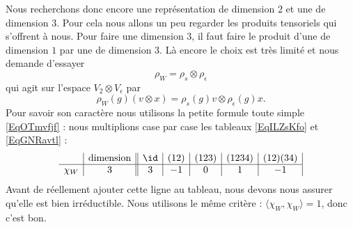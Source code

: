 Nous recherchons donc encore une représentation de dimension \( 2\) et une de dimension \( 3\). Pour cela nous allons un peu regarder les produits tensoriels qui s'offrent à nous. Pour faire une dimension \( 3\), il faut faire le produit d'une de dimension \( 1\) par une de dimension \( 3\). Là encore le choix est très limité et nous demande d'essayer
\begin{equation}
    \rho_W=\rho_s\otimes \rho_{\epsilon}
\end{equation}
qui agit sur l'espace \( V_2\otimes V_{\epsilon}\) par
\begin{equation}
    \rho_W(g)(v\otimes x)=\rho_s(g)v\otimes \rho_{\epsilon}(g)x.
\end{equation}
Pour savoir son caractère nous utilisons la petite formule toute simple \eqref{EqOTmvfjf} : nous multiplions case par case les tableaux \eqref{EqILZsKfo} et \eqref{EqGNRavtl} :
\begin{equation}
    \begin{array}[]{c|c||c|c|c|c|c|}
        &\text{dimension}&\id&(12)&(123)&(1234)&(12)(34)\\
          \hline
          \chi_{W}&3&3&-1&0&1&-1\\ 
    \end{array}
\end{equation}
Avant de réellement ajouter cette ligne au tableau, nous devons nous assurer qu'elle est bien irréductible. Nous utilisons le même critère : \( \langle \chi_W, \chi_W\rangle =1\), donc c'est bon.

